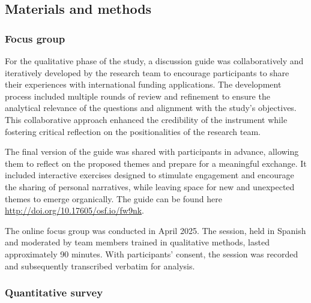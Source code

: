\documentclass[
  letterpaper,
  DIV=11,
  numbers=noendperiod]{scrartcl}
\begin{document}
\subsection{Materials and methods}\label{materials-and-methods}

\subsubsection{Focus group}\label{focus-group}

For the qualitative phase of the study, a discussion guide was
collaboratively and iteratively developed by the research team to
encourage participants to share their experiences with international
funding applications. The development process included multiple rounds
of review and refinement to ensure the analytical relevance of the
questions and alignment with the study's objectives. This collaborative
approach enhanced the credibility of the instrument while fostering
critical reflection on the positionalities of the research team.

The final version of the guide was shared with participants in advance,
allowing them to reflect on the proposed themes and prepare for a
meaningful exchange. It included interactive exercises designed to
stimulate engagement and encourage the sharing of personal narratives,
while leaving space for new and unexpected themes to emerge organically.
The guide can be found here \url{http://doi.org/10.17605/osf.io/fw9nk}.

The online focus group was conducted in April 2025. The session, held in
Spanish and moderated by team members trained in qualitative methods,
lasted approximately 90 minutes. With participants' consent, the session
was recorded and subsequently transcribed verbatim for analysis.

\subsubsection{Quantitative survey}\label{quantitative-survey}
\end{document}
